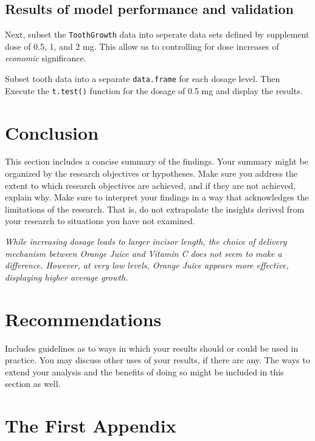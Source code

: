 \documentclass[12pt,oneside]{chicagocapstone}
\begin{document}
\section*{Results of model performance and
validation}\label{results-of-model-performance-and-validation}

Next, subset the \texttt{ToothGrowth} data into seperate data sets
defined by supplement dose of 0.5, 1, and 2 mg. This allow us to
controlling for dose increases of \emph{economic} significance.

Subset tooth data into a separate \texttt{data.frame} for each dosage
level. Then Execute the \texttt{t.test()} function for the dosage of 0.5
mg and display the results.

\chapter*{Conclusion}\label{conclusion}

This section includes a concise summary of the findings. Your summary
might be organized by the research objectives or hypotheses. Make sure
you address the extent to which research objectives are achieved, and if
they are not achieved, explain why. Make sure to interpret your findings
in a way that acknowledges the limitations of the research. That is, do
not extrapolate the insights derived from your research to situations
you have not examined.

\emph{While increasing dosage leads to larger incisor length, the choice
of delivery mechanism between Orange Juice and Vitamin C does not seem
to make a difference. However, at very low levels, Orange Juice appears
more effective, displaying higher average growth.}

\chapter*{Recommendations}\label{recommendations}

Includes guidelines as to ways in which your results should or could be
used in practice. You may discuss other uses of your results, if there
are any. The ways to extend your analysis and the benefits of doing so
might be included in this section as well.

\appendix

\chapter{The First Appendix}\label{the-first-appendix}
\end{document}
